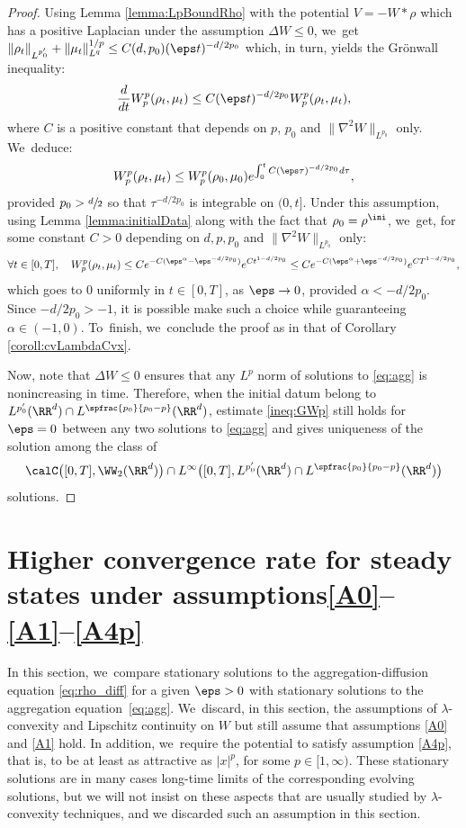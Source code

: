 \begin{proof}
Using Lemma \ref{lemma:LpBoundRho} with the potential $V = -W*\rho$ which has a positive Laplacian under the assumption $\Delta W \leq 0$, we~get $\|\rho_t\|_{L^{p_0'}} + \|\mu_t\|_{L^q}^{1/p} \leq C(d,p_0)(\eps t)^{-d/2p_0}$ which, in turn, yields the Grönwall inequality:
\[
\frac{d}{dt} W_p^p(\rho_t, \mu_t) \leq C(\eps t)^{-d/2p_0} W_p^p(\rho_t, \mu_t),
\]
where $C$ is a positive constant that depends on $p$, $p_0$ and $\|\nabla^2 W\|_{L^{p_0}}$ only. We~deduce:
\begin{equation*}%
W_p^p(\rho_t, \mu_t) \leq W_p^p(\rho_0, \mu_0) e^{\int_0^t C(\eps \tau)^{-d/2p_0} d\tau},
\end{equation*}
provided $p_0 > \sfrac d2$ so that $\tau^{-d/2p_0}$ is integrable on $(0,t]$. Under this assumption, using Lemma \ref{lemma:initialData} along with the fact that $\rho_0 = \rho^{\ini}$, we~get, for some constant $C>0$ depending on $d, p, p_0$ and $\|\nabla^2 W\|_{L^{p_0}}$ only:
\[
\forall t \in [0,T], \quad W_p^p(\rho_t, \mu_t) \leq C e^{-C(\eps^{\alpha} - \eps^{-d/2p_0})} e^{Ct^{1-d/2p_0}} \leq C e^{-C(\eps^{\alpha} + \eps^{-d/2p_0})} e^{CT^{1-d/2p_0}},
\]
which goes to 0 uniformly in $t \in [0,T]$, as $\eps \to 0$, provided $\alpha < -d/2p_0$. Since $-d/2p_0 > -1$, it is possible make such a choice while guaranteeing $\alpha \in (-1,0)$. To~finish, we~conclude the proof as in that of Corollary \ref{coroll:cvLambdaCvx}.

Now, note that $\Delta W \leq 0$ ensures that any $L^p$ norm of solutions to \eqref{eq:agg} is nonincreasing in time. Therefore, when the initial datum belong to $L^{p_0'}(\RR^d) \cap L^{\spfrac{p_0}{p_0-p}}(\RR^d)$, estimate \eqref{ineq:GWp} still holds for $\eps=0$ between any two solutions to \eqref{eq:agg} and gives uniqueness of the solution among the class of
\[
\calC\bigl([0,T], \WW_2(\RR^d)\bigr) \cap L^\infty\bigl([0,T], L^{p_0'}(\RR^d) \cap L^{\spfrac{p_0}{p_0-p}}(\RR^d)\bigl)
\]
solutions.
\end{proof}

\section{Higher convergence rate for steady states under assumptions\protect\line \texorpdfstring{\protect\eqref{A0}--\protect\eqref{A1}--\protect\eqref{A4p}}{Ap}}\label{section:stationary}

In this section, we~compare stationary solutions to the aggregation-diffusion equation \eqref{eq:rho_diff} for a given $\eps>0$ with stationary solutions to the aggregation equation~\eqref{eq:agg}. We~discard, in this section, the assumptions of $\lambda$-convexity and Lipschitz continuity on $W$ but still assume that assumptions \eqref{A0} and \eqref{A1} hold. In addition, we~require the potential to satisfy assumption \eqref{A4p}, that is, to be at least as attractive as $|x|^p$, for some $p \in [1, \infty)$.
These stationary solutions are in many cases long-time limits of the corresponding evolving solutions, but we will not insist on these aspects that are usually studied by $\lambda$-convexity techniques, and we discarded such an assumption in this section.

